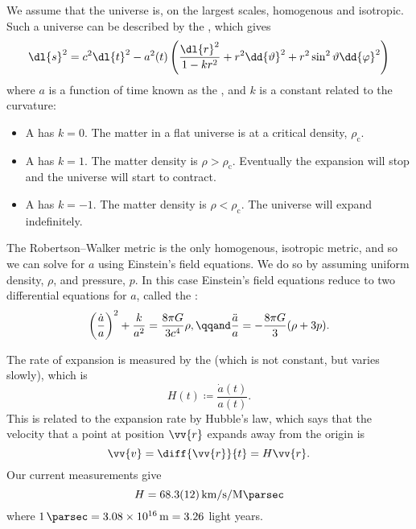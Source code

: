\documentclass[fleqn]{NotesClass}
\begin{document}
    We assume that the universe is, on the largest scales, homogenous and isotropic.
    Such a universe can be described by the , which gives
    \begin{equation}
        \dl{s}^2 = c^2\dl{t}^2 - a^2(t) \left( \frac{\dl{r}^2}{1 - kr^2} + r^2\dd{\vartheta}^2 + r^2 \sin^2\vartheta \dd{\varphi}^2 \right)
    \end{equation}
    where \(a\) is a function of time known as the , and \(k\) is a constant related to the curvature:
    \begin{itemize}
        \item A  has \(k = 0\).
        The matter in a flat universe is at a critical density, \(\rho_{\mathrm{c}}\).
        \item A  has \(k = 1\).
        The matter density is \(\rho > \rho_{\mathrm{c}}\).
        Eventually the expansion will stop and the universe will start to contract.
        \item A  has \(k = -1\).
        The matter density is \(\rho < \rho_{\mathrm{c}}\).
        The universe will expand indefinitely.
    \end{itemize}
    
    The Robertson--Walker metric is the only homogenous, isotropic metric, and so we can solve for \(a\) using Einstein's field equations.
    We do so by assuming uniform density, \(\rho\), and pressure, \(p\).
    In this case Einstein's field equations reduce to two differential equations for \(a\), called the :
    \begin{equation}
        \left( \frac{\dot{a}}{a} \right)^2 + \frac{k}{a^2} = \frac{8\pi G}{3c^4}\rho, \qqand \frac{\ddot{a}}{a} = -\frac{8\pi G}{3} (\rho + 3p).
    \end{equation}
    
    The rate of expansion is measured by the  (which is not constant, but varies slowly), which is
    \begin{equation}
        H(t) \coloneqq \frac{\dot{a}(t)}{a(t)}.
    \end{equation}
    This is related to the expansion rate by Hubble's law, which says that the velocity that a point at position \(\vv{r}\) expands away from the origin is
    \begin{equation}
        \vv{v} = \diff{\vv{r}}{t} = H\vv{r}.
    \end{equation}
    Our current measurements give
    \begin{equation}
        H = \qty{68.3+-1.2}{\kilo\metre\per\second\per\mega\parsec}
    \end{equation}
    where \(\qty{1}{\parsec} = \qty{3.08e16}{\metre} = 3.26\) light years.
    
\end{document}
